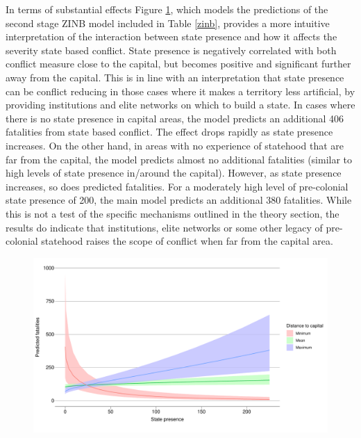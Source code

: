 \documentclass[12pt]{article}
\begin{document}
In terms of substantial effects Figure \ref{deaths_zinb}, which models the
predictions of the second stage ZINB model included in Table \ref{zinb},
provides a more intuitive interpretation of the interaction between state
presence and how it affects the severity state based conflict. State presence is
negatively correlated with both conflict measure close to the capital, but
becomes positive and significant further away from the capital. This is in line
with an interpretation that state presence can be conflict reducing in those
cases where it makes a territory less artificial, by providing institutions and
elite networks on which to build a state. In cases where there is no state
presence in capital areas, the model predicts an additional 406 fatalities from
state based conflict. The effect drops rapidly as state presence increases. On
the other hand, in areas with no experience of statehood that are far from the
capital, the model predicts almost no additional fatalities (similar to high
levels of state presence in/around the capital). However, as state presence
increases, so does predicted fatalities. For a moderately high level of
pre-colonial state presence of 200, the main model predicts an additional 380
fatalities. While this is not a test of the specific mechanisms outlined in the
theory section, the results do indicate that institutions, elite networks or
some other legacy of pre-colonial statehood raises the scope of conflict
when far from the capital area.


\begin{figure}[htpb]
	\centering
	\includegraphics[width=\linewidth]{"../R/Output/zinbplot.pdf"}
	\caption{}
	\label{deaths_zinb}
\end{figure}
\end{document}

